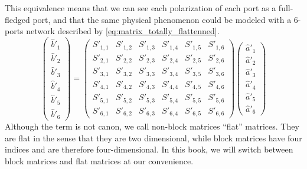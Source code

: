 This equivalence means that we can see each polarization of each port as a full-fledged port, and that the same physical phenomenon could be modeled with a 6-ports network described by \cref{eq:matrix_totally_flattenned}.
\begin{equation}
    \begin{pmatrix}
        \hat{b}'_1 \\ \hat{b}'_2 \\ \hat{b}'_3 \\ \hat{b}'_{4} \\ \hat{b}'_{5} \\ \hat{b}'_{6}
    \end{pmatrix}
    =
    \begin{pmatrix}
        S'_{1, 1} & S'_{1, 2} & S'_{1, 3} & S'_{1, 4} & S'_{1, 5} & S'_{1, 6} \\
        S'_{2, 1} & S'_{2, 2} & S'_{2, 3} & S'_{2, 4} & S'_{2, 5} & S'_{2, 6} \\
        S'_{3, 1} & S'_{3, 2} & S'_{3, 3} & S'_{3, 4} & S'_{3, 5} & S'_{3, 6} \\
        S'_{4, 1} & S'_{4, 2} & S'_{4, 3} & S'_{4, 4} & S'_{4, 5} & S'_{4, 6} \\
        S'_{5, 1} & S'_{5, 2} & S'_{5, 3} & S'_{5, 4} & S'_{5, 5} & S'_{5, 6} \\
        S'_{6, 1} & S'_{6, 2} & S'_{6, 3} & S'_{6, 4} & S'_{6, 5} & S'_{6, 6}
    \end{pmatrix}
    \begin{pmatrix}
        \hat{a}'_1 \\ \hat{a}'_2 \\ \hat{a}'_3 \\ \hat{a}'_{4} \\ \hat{a}'_{5} \\ \hat{a}'_{6}
    \end{pmatrix}
    \label{eq:matrix_totally_flattenned}
\end{equation}
Although the term is not canon, we call non-block matrices ``flat'' matrices.
They are flat in the sense that they are two dimensional, while block matrices have four indices and are therefore four-dimensional.
In this book, we will switch between block matrices and flat matrices at our convenience.






